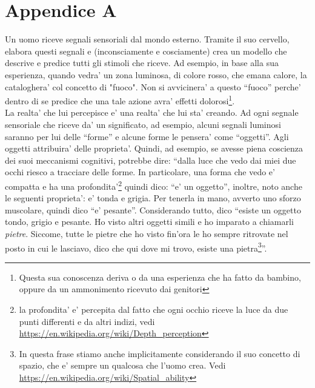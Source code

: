 \section{Appendice A}
\label{menteCrea}

Un uomo riceve segnali sensoriali dal mondo esterno. Tramite il suo cervello, elabora questi segnali e (inconsciamente e cosciamente) crea un modello che descrive e predice tutti gli stimoli che riceve. Ad esempio, in base alla sua esperienza, quando vedra' un zona luminosa, di colore rosso, che emana calore, la cataloghera' col concetto di "fuoco". Non si avvicinera' a questo ``fuoco'' perche' dentro di se predice che una tale azione avra' effetti dolorosi\footnote{Questa sua conoscenza deriva o da una esperienza che ha fatto da bambino, oppure da un ammonimento ricevuto dai genitori}.\\
La realta' che lui percepisce e' una realta' che lui sta' creando. Ad ogni segnale sensoriale che riceve da' un significato, ad esempio, alcuni segnali luminosi saranno per lui delle ``forme'' e alcune forme le pensera' come ``oggetti''. Agli oggetti attribuira' delle proprieta'.  Quindi, ad esempio, se avesse piena coscienza dei suoi meccanismi cognitivi, potrebbe dire: ``dalla luce che vedo dai miei due occhi riesco a tracciare delle forme. In particolare, una forma che vedo e' compatta e ha una profondita'\footnote{la profondita' e' percepita dal fatto che ogni occhio riceve la luce da due punti differenti e da altri indizi, vedi \url{https://en.wikipedia.org/wiki/Depth\_perception}} quindi dico: ``e' un oggetto'', inoltre, noto anche le seguenti proprieta': e' tonda e grigia. Per tenerla in mano, avverto uno sforzo muscolare, quindi dico ``e' pesante''. Considerando tutto, dico ``esiste un oggetto tondo, grigio e pesante. Ho visto altri oggetti simili e ho imparato a chiamarli \emph{pietre}. Siccome, tutte le pietre che ho visto fin'ora le ho sempre ritrovate nel posto in cui le lasciavo, dico che qui dove mi trovo, esiste una pietra\footnote{In questa frase stiamo anche implicitamente considerando il suo concetto di spazio, che e' sempre un qualcosa che l'uomo crea. Vedi \url{https://en.wikipedia.org/wiki/Spatial\_ability}}''.\\




